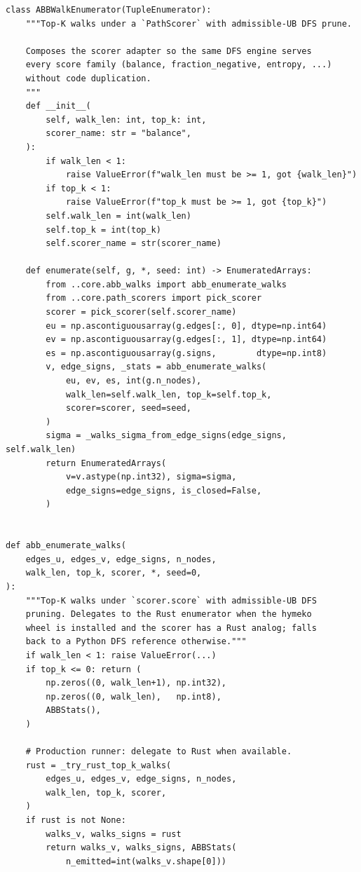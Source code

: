 \documentclass[11pt]{article}
\begin{document}
\begin{lstlisting}[style=pythonstyle]
class ABBWalkEnumerator(TupleEnumerator):
    """Top-K walks under a `PathScorer` with admissible-UB DFS prune.

    Composes the scorer adapter so the same DFS engine serves
    every score family (balance, fraction_negative, entropy, ...)
    without code duplication.
    """
    def __init__(
        self, walk_len: int, top_k: int,
        scorer_name: str = "balance",
    ):
        if walk_len < 1:
            raise ValueError(f"walk_len must be >= 1, got {walk_len}")
        if top_k < 1:
            raise ValueError(f"top_k must be >= 1, got {top_k}")
        self.walk_len = int(walk_len)
        self.top_k = int(top_k)
        self.scorer_name = str(scorer_name)

    def enumerate(self, g, *, seed: int) -> EnumeratedArrays:
        from ..core.abb_walks import abb_enumerate_walks
        from ..core.path_scorers import pick_scorer
        scorer = pick_scorer(self.scorer_name)
        eu = np.ascontiguousarray(g.edges[:, 0], dtype=np.int64)
        ev = np.ascontiguousarray(g.edges[:, 1], dtype=np.int64)
        es = np.ascontiguousarray(g.signs,        dtype=np.int8)
        v, edge_signs, _stats = abb_enumerate_walks(
            eu, ev, es, int(g.n_nodes),
            walk_len=self.walk_len, top_k=self.top_k,
            scorer=scorer, seed=seed,
        )
        sigma = _walks_sigma_from_edge_signs(edge_signs, self.walk_len)
        return EnumeratedArrays(
            v=v.astype(np.int32), sigma=sigma,
            edge_signs=edge_signs, is_closed=False,
        )


def abb_enumerate_walks(
    edges_u, edges_v, edge_signs, n_nodes,
    walk_len, top_k, scorer, *, seed=0,
):
    """Top-K walks under `scorer.score` with admissible-UB DFS
    pruning. Delegates to the Rust enumerator when the hymeko
    wheel is installed and the scorer has a Rust analog; falls
    back to a Python DFS reference otherwise."""
    if walk_len < 1: raise ValueError(...)
    if top_k <= 0: return (
        np.zeros((0, walk_len+1), np.int32),
        np.zeros((0, walk_len),   np.int8),
        ABBStats(),
    )

    # Production runner: delegate to Rust when available.
    rust = _try_rust_top_k_walks(
        edges_u, edges_v, edge_signs, n_nodes,
        walk_len, top_k, scorer,
    )
    if rust is not None:
        walks_v, walks_signs = rust
        return walks_v, walks_signs, ABBStats(
            n_emitted=int(walks_v.shape[0]))


\end{lstlisting}
\end{document}
